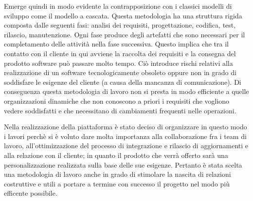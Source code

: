 Emerge quindi in modo evidente la contrapposizione con i classici modelli di sviluppo come il modello a cascata.
Questa metodologia ha una struttura rigida composta dalle seguenti fasi: analisi dei requisiti, progettazione, codifica, test, rilascio, manutenzione.
Ogni fase produce degli artefatti che sono necessari per il completamento delle attività nella fase successiva. Questo implica che tra il contatto con il cliente
in qui avviene la raccolta dei requisiti e la consegna del prodotto software può passare molto tempo.
Ciò introduce rischi relativi alla realizzazione di un software tecnologicamente obsoleto oppure non in grado di soddisfare le
esigenze del cliente (a causa della mancanza di comunicazione).
Di conseguenza questa metodologia di lavoro non si presta in modo efficiente a quelle organizzazioni dinamiche che non conoscono
a priori i requisiti che vogliono vedere soddisfatti e che necessitano di cambiamenti frequenti nelle operazioni.

Nella realizzazione della piattaforma è stato deciso di organizzare in questo modo i lavori perchè si è voluto dare molta importanza
alla collaborazione fra i team di lavoro, all'ottimizzazione del processo di integrazione e rilascio di aggiornamenti e
alla relazione con il cliente; in quanto il prodotto che verrà offerto sarà una personalizzazione realizzata sulla base delle sue esigenze.
Pertanto è stata scelta una metodologia di lavoro anche in grado di stimolare la nascita di relazioni costruttive e utili a portare a termine con successo il progetto
nel modo più efficente possibile.



